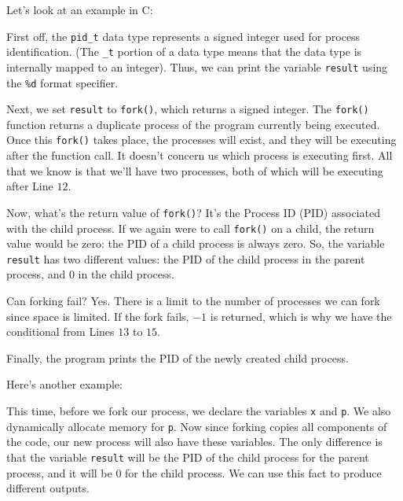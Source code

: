 Let's look at an example in C:

\lstset{
caption=Forking 1
}
\begin{center}
\label{Forking Example 1}
\end{center}

First off, the \verb!pid_t! data type represents a signed integer used for process identification. (The \verb!_t! portion of a data type means that the data type is internally mapped to an integer). Thus, we can print the variable \verb!result! using the \verb!%d! format specifier. 

Next, we set \verb!result! to \verb!fork()!, which returns a signed integer. The \verb!fork()! function returns a duplicate process of the program currently being executed. Once this \verb!fork()! takes place, the processes will exist, and they will be executing after the function call. It doesn't concern us which process is executing first. All that we know is that we'll have two processes, both of which will be executing after Line $12$. 

Now, what's the return value of \verb!fork()!? It's the Process ID (PID) associated with the child process. If we again were to call \verb!fork()! on a child, the return value would be zero: the PID of a child process is always zero. So, the variable \verb!result! has two different values: the PID of the child process in the parent process, and $0$ in the child process.

Can forking fail? Yes. There is a limit to the number of processes we can fork since space is limited. If the fork fails, $-1$ is returned, which is why we have the conditional from Lines $13$ to $15$.

Finally, the program prints the PID of the newly created child process. 


Here's another example:

\lstset{
caption=Forking 2
}
\begin{center}
\label{Forking Example 2}
\end{center}

This time, before we fork our process, we declare the variables \verb!x! and \verb!p!. We also dynamically allocate memory for \verb!p!. Now since forking copies all components of the code, our new process will also have these variables. The only difference is that the variable \verb!result! will be the PID of the child process for the parent process, and it will be $0$ for the child process. We can use this fact to produce different outputs.

